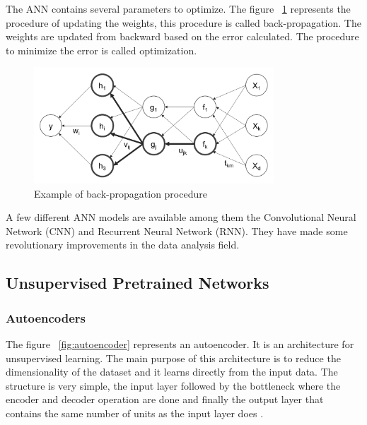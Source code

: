 The ANN contains several parameters to optimize. The figure 
~\ref{fig:backpropragation} represents the procedure of updating the weights, this procedure is called back-propagation. The weights are updated from backward based on the error calculated. The procedure to minimize the error is called optimization.

\begin{figure}[H]
\centering
\includegraphics[width=0.8\textwidth]{./figures/backpropagation}
\caption{Example of back-propagation procedure \cite{rajalingappaa}}
\label{fig:backpropragation}
\end{figure}

   
A few different ANN models are available among them the Convolutional Neural Network (CNN) and Recurrent Neural Network (RNN). They have made some revolutionary improvements in the data analysis field. 

\subsection[Unsupervised Pretrained Networks]{Unsupervised Pretrained Networks}

\subsubsection[Autoencoders]{Autoencoders}

The figure ~\ref{fig:autoencoder} represents an autoencoder. It is an architecture for unsupervised learning. The main purpose of this architecture is to reduce the dimensionality of the dataset and it learns directly from the input data. 
The structure is very simple, the input layer followed by the bottleneck where the encoder and decoder operation are done and finally the output layer that contains the same number of units as the input layer does \cite{dp4j-deep-learning}.

